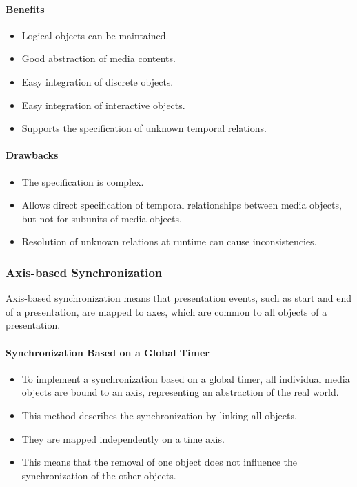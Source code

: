 \paragraph*{Benefits}
\begin{multicols}{2}
	\begin{itemize}
		\item Logical objects can be maintained.
		\item Good abstraction of media contents.
		\item Easy integration of discrete objects.
		\item Easy integration of interactive objects.
		\item Supports the specification of unknown temporal relations.
	\end{itemize}
\end{multicols}


\paragraph*{Drawbacks}
\begin{multicols}{2}
\begin{itemize}
	\item The specification is complex.
	\item Allows direct specification of temporal relationships between media objects, but not for subunits of media objects.
	\item Resolution of unknown relations at runtime can cause inconsistencies.
\end{itemize}
\end{multicols}


\subsubsection{Axis-based Synchronization}
Axis-based synchronization means that presentation events, such as start and end of a presentation, are mapped to axes, which are common to all objects of a presentation.

\paragraph*{Synchronization Based on a Global Timer}
\begin{multicols}{2}
	\begin{itemize}
		\item To implement a synchronization based on a global timer, all individual media objects are bound to an axis, representing an abstraction of the real world. 
		\item This method describes the synchronization by linking all objects. 
		\item They are mapped independently on a time axis. 
		\item This means that the removal of one object does not influence the synchronization of the other objects.
	\end{itemize}
\end{multicols}

